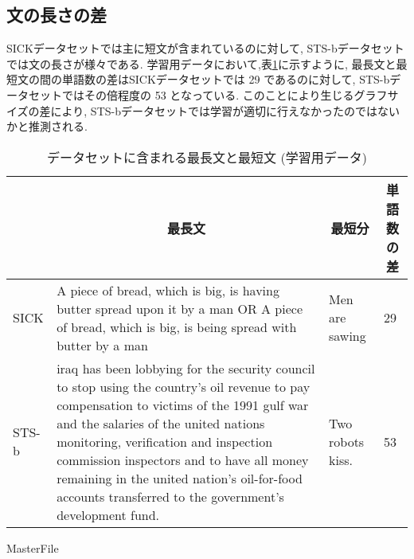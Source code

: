 \documentclass[a4j,twoside,12pt]{thesis} %
\begin{document}
\subsection{文の長さの差}
SICKデータセットでは主に短文が含まれているのに対して, STS-bデータセットでは文の長さが様々である.
学習用データにおいて,表\ref{table:len}に示すように, 最長文と最短文の間の単語数の差はSICKデータセットでは 29 であるのに対して, STS-bデータセットではその倍程度の 53 となっている.
このことにより生じるグラフサイズの差により, STS-bデータセットでは学習が適切に行えなかったのではないかと推測される.
\begin{table}
  \caption{データセットに含まれる最長文と最短文 (学習用データ)}
  \label{table:len}
  \begin{center}
  \begin{tabularx}{\linewidth}{l||X|X|X}
    \hline
          & \multicolumn{1}{c|}{最長文} & \multicolumn{1}{c|}{最短分} & \multicolumn{1}{c}{単語数の差} \\
    \hline
    \hline
    SICK &
    A piece of bread, which is big, is having butter spread upon it by a man OR A piece of bread, which is big, is being spread with butter by a man &
    Men are sawing &
    29 \\

    \hline
    STS-b &
    iraq has been lobbying for the security council to stop using the country's oil revenue to pay compensation to victims of the 1991 gulf war and the salaries of the united nations monitoring, verification and inspection commission inspectors and to have all money remaining in the united nation's oil-for-food accounts transferred to the government's development fund. &
    Two robots kiss. &
    53 \\
    \hline

  \end{tabularx}
  \end{center}
\end{table}

\expandafter\ifx\csname MasterFile\endcsname\relax
\def\MasterFile{本原稿です}

% 


\end{document}
